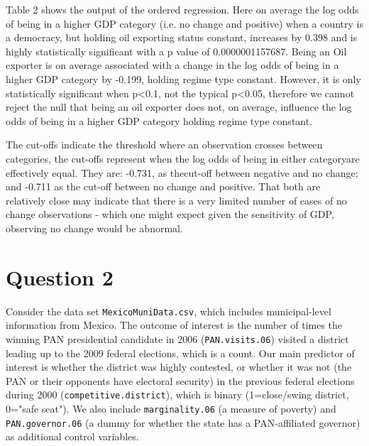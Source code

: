 \documentclass[12pt,letterpaper]{article}
\begin{document}
	Table 2 shows the output of the ordered regression. Here on average the log odds of being in a higher GDP category (i.e. no change and positive) when a country is a democracy, but holding oil exporting status constant, increases by 0.398 and is highly statistically significant with a p value of 0.0000001157687. Being an Oil exporter is on average associated with a change in the log odds of being in a higher GDP category by -0.199, holding regime type constant. However, it is only statistically significant when p<0.1, not the typical p<0.05, therefore we cannot reject the null that being an oil exporter does not, on average, influence the log odds of being in a higher GDP category holding regime type constant.
	
	The cut-offs indicate the threshold where an observation crosses between categories, the cut-offs represent when the log odds of being in either categoryare effectively equal. They are: -0.731, as thecut-off between negative and no change; and -0.711 as the  cut-off between no change and positive. That both are relatively close may indicate that there is a very limited number of cases of no change observations - which one might expect given the sensitivity of GDP, observing no change would be abnormal.
	
	\newpage
	\section*{Question 2} 
	\vspace{.25cm}
	
	\noindent Consider the data set \texttt{MexicoMuniData.csv}, which includes municipal-level information from Mexico. The outcome of interest is the number of times the winning PAN presidential candidate in 2006 (\texttt{PAN.visits.06}) visited a district leading up to the 2009 federal elections, which is a count. Our main predictor of interest is whether the district was highly contested, or whether it was not (the PAN or their opponents have electoral security) in the previous federal elections during 2000 (\texttt{competitive.district}), which is binary (1=close/swing district, 0="safe seat"). We also include \texttt{marginality.06} (a measure of poverty) and \texttt{PAN.governor.06} (a dummy for whether the state has a PAN-affiliated governor) as additional control variables. 
	
\end{document}
